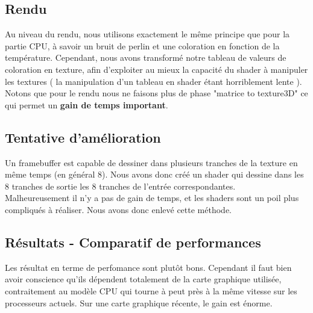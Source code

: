 \documentclass[a4paper,10pt]{article}
\begin{document}
 
\subsection{Rendu}
Au niveau du rendu, nous utilisons exactement le même principe que pour la partie CPU,
à savoir un bruit de perlin et une coloration en fonction de la température.
Cependant, nous avons transformé notre tableau de valeurs de coloration en texture,
afin d'exploiter au mieux la capacité du shader à manipuler les textures ( la manipulation
d'un tableau en shader étant horriblement lente ).
Notons que pour le rendu nous ne faisons plus de phase "matrice to texture3D" ce qui permet
un \textbf{gain de temps important}.

 
\subsection{Tentative d'amélioration}
Un framebuffer est capable de dessiner dans plusieurs tranches de la
texture en même temps (en général 8). Nous avons donc créé un shader qui dessine
dans les 8 tranches de sortie les 8 tranches de l'entrée
correspondantes.\\
Malheureusement il n'y a pas de gain de temps, et les shaders sont
un poil plus compliqués à réaliser. Nous avons donc enlevé cette méthode.

\subsection{Résultats - Comparatif de performances}
Les résultat en terme de perfomance sont plutôt bons. Cependant il faut
bien avoir conscience qu'ils dépendent totalement de la carte graphique utilisée,
contraitement au modèle CPU qui tourne à peut près à la même vitesse sur les processeurs
actuels. Sur une carte graphique récente, le gain est énorme.\\
\end{document}
